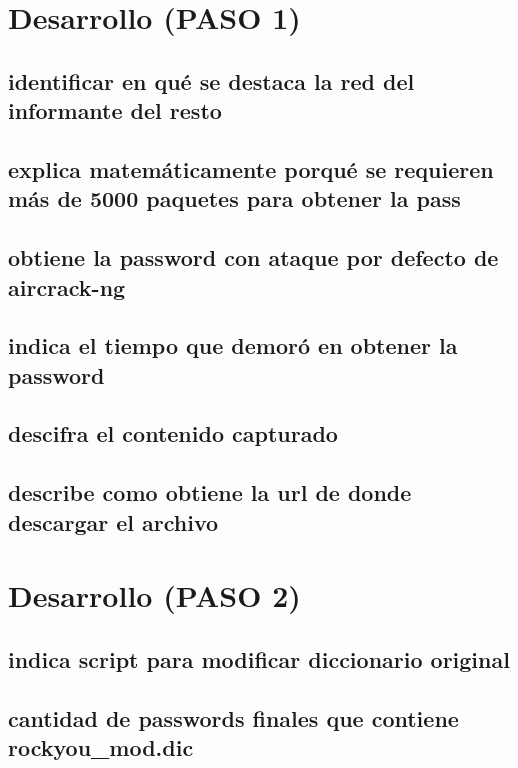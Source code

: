 \documentclass[letter,12pt]{article}
\begin{document}
\section{Desarrollo (PASO 1)}

\subsection{identificar en qué se destaca la red del informante del resto}

\subsection{explica matemáticamente porqué se requieren más de 5000 paquetes para obtener la pass}

\subsection{obtiene la password con ataque por defecto de aircrack-ng}


\subsection{indica el tiempo que demoró en obtener la password}

\subsection{descifra el contenido capturado}

\subsection{describe como obtiene la url de donde descargar el archivo}


\section{Desarrollo (PASO 2)}

\subsection{indica script para modificar diccionario original}

\subsection{cantidad de passwords finales que contiene rockyou\_mod.dic}
\end{document}
